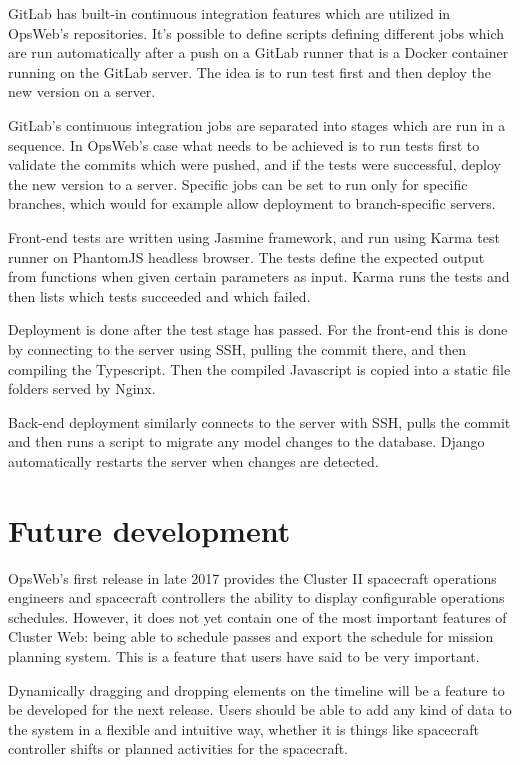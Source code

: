 GitLab has built-in continuous integration features which are utilized in OpsWeb's repositories. It's possible to define scripts defining different jobs which are run automatically after a push on a GitLab runner that is a Docker container running on the GitLab server. The idea is to run test first and then deploy the new version on a server.

GitLab's continuous integration jobs are separated into stages which are run in a sequence. In OpsWeb's case what needs to be achieved is to run tests first to validate the commits which were pushed, and if the tests were successful, deploy the new version to a server. Specific jobs can be set to run only for specific branches, which would for example allow deployment to branch-specific servers.

Front-end tests are written using Jasmine framework, and run using Karma test runner on PhantomJS headless browser. The tests define the expected output from functions when given certain parameters as input. Karma runs the tests and then lists which tests succeeded and which failed.

Deployment is done after the test stage has passed. For the front-end this is done by connecting to the server using SSH, pulling the commit there, and then compiling the Typescript. Then the compiled Javascript is copied into a static file folders served by Nginx.

Back-end deployment similarly connects to the server with SSH, pulls the commit and then runs a script to migrate any model changes to the database. Django automatically restarts the server when changes are detected.
\section{Future development}
OpsWeb's first release in late 2017 provides the Cluster II spacecraft operations engineers and spacecraft controllers the ability to display configurable operations schedules. However, it does not yet contain one of the most important features of Cluster Web: being able to schedule passes and export the schedule for mission planning system. This is a feature that users have said to be very important.

Dynamically dragging and dropping elements on the timeline will be a feature to be developed for the next release. Users should be able to add any kind of data to the system in a flexible and intuitive way, whether it is things like spacecraft controller shifts or planned activities for the spacecraft.

